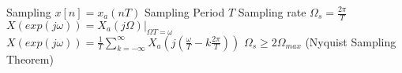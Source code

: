 \documentclass[14pt]{extarticle}
\begin{document}
\begin{outline}
		\1	Sampling
			\2	$x[n] = x_a(nT)$
				\3	Sampling Period $T$
				\3	Sampling rate $\Omega_{s} = \frac{2\pi}{T}$
			\2	$X(exp(j\omega)) = X_a(j\Omega)|_{\Omega T = \omega}$
			\2	$X(exp(j\omega)) = \frac{1}{T}\sum_{k = -\infty}^{\infty} 
					X_a(j(\frac{\omega}{T} - k \frac{2\pi}{T}))$
			\2	$\Omega_s \ge 2\Omega_{max}$ (Nyquist Sampling Theorem)


	\end{outline}
\end{document}
